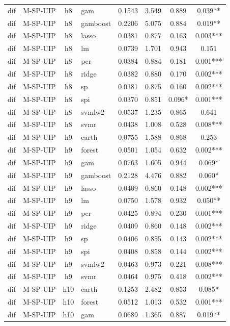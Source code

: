 \begin{ThreePartTable}
\begin{longtable}[t]{llclcccc}
dif & M-SP-UIP & h8 & gam & 0.1543 & 3.549 & 0.889 & 0.039**\\
dif & M-SP-UIP & h8 & gamboost & 0.2206 & 5.075 & 0.884 & 0.019**\\
dif & M-SP-UIP & h8 & lasso & 0.0381 & 0.877 & 0.163 & 0.003***\\
dif & M-SP-UIP & h8 & lm & 0.0739 & 1.701 & 0.943 & 0.151\\
dif & M-SP-UIP & h8 & pcr & 0.0384 & 0.884 & 0.181 & 0.001***\\
dif & M-SP-UIP & h8 & ridge & 0.0382 & 0.880 & 0.170 & 0.002***\\
dif & M-SP-UIP & h8 & sp & 0.0381 & 0.875 & 0.160 & 0.002***\\
dif & M-SP-UIP & h8 & spi & 0.0370 & 0.851 & 0.096* & 0.001***\\
dif & M-SP-UIP & h8 & svmlw2 & 0.0537 & 1.235 & 0.865 & 0.641\\
dif & M-SP-UIP & h8 & svmr & 0.0438 & 1.008 & 0.528 & 0.008***\\
\addlinespace
dif & M-SP-UIP & h9 & earth & 0.0755 & 1.588 & 0.868 & 0.253\\
dif & M-SP-UIP & h9 & forest & 0.0501 & 1.054 & 0.632 & 0.002***\\
dif & M-SP-UIP & h9 & gam & 0.0763 & 1.605 & 0.944 & 0.069*\\
dif & M-SP-UIP & h9 & gamboost & 0.2128 & 4.476 & 0.882 & 0.060*\\
dif & M-SP-UIP & h9 & lasso & 0.0409 & 0.860 & 0.148 & 0.002***\\
dif & M-SP-UIP & h9 & lm & 0.0750 & 1.578 & 0.932 & 0.050**\\
dif & M-SP-UIP & h9 & pcr & 0.0425 & 0.894 & 0.230 & 0.001***\\
dif & M-SP-UIP & h9 & ridge & 0.0409 & 0.860 & 0.148 & 0.002***\\
dif & M-SP-UIP & h9 & sp & 0.0406 & 0.855 & 0.143 & 0.002***\\
dif & M-SP-UIP & h9 & spi & 0.0408 & 0.858 & 0.144 & 0.002***\\
dif & M-SP-UIP & h9 & svmlw2 & 0.0463 & 0.973 & 0.221 & 0.008***\\
dif & M-SP-UIP & h9 & svmr & 0.0464 & 0.975 & 0.418 & 0.002***\\
\addlinespace
dif & M-SP-UIP & h10 & earth & 0.1253 & 2.482 & 0.853 & 0.085*\\
dif & M-SP-UIP & h10 & forest & 0.0512 & 1.013 & 0.532 & 0.001***\\
dif & M-SP-UIP & h10 & gam & 0.0689 & 1.365 & 0.887 & 0.019**\\

\end{longtable}
\end{ThreePartTable}
